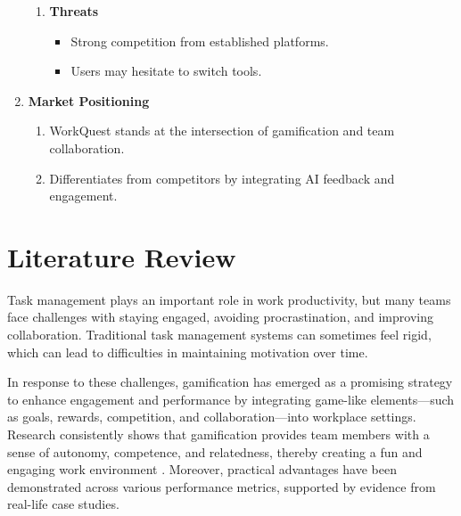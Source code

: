 \begin{enumerate}
\begin{enumerate}
        \item \textbf{Threats}
        \begin{itemize}
            \item Strong competition from established platforms.
            \item Users may hesitate to switch tools.
        \end{itemize}
    \end{enumerate}

    \item \textbf{Market Positioning}
    \begin{enumerate}
        \item WorkQuest stands at the intersection of gamification and team collaboration.
        \item Differentiates from competitors by integrating AI feedback and engagement.
    \end{enumerate}

\end{enumerate}



\section{Literature Review}
\label{section:literature-review}
    Task management plays an important role in work productivity, but many teams face challenges with staying engaged, avoiding procrastination, and improving collaboration. Traditional task management systems can sometimes feel rigid, which can lead to difficulties in maintaining motivation over time.

    In response to these challenges, gamification has emerged as a promising strategy to enhance engagement and performance by integrating game-like elements—such as goals, rewards, competition, and collaboration—into workplace settings. Research consistently shows that gamification provides team members with a sense of autonomy, competence, and relatedness, thereby creating a fun and engaging work environment \cite{ncbi:pmc10905147}. Moreover, practical advantages have been demonstrated across various performance metrics, supported by evidence from real-life case studies. \cite{Employee:Gamification}

